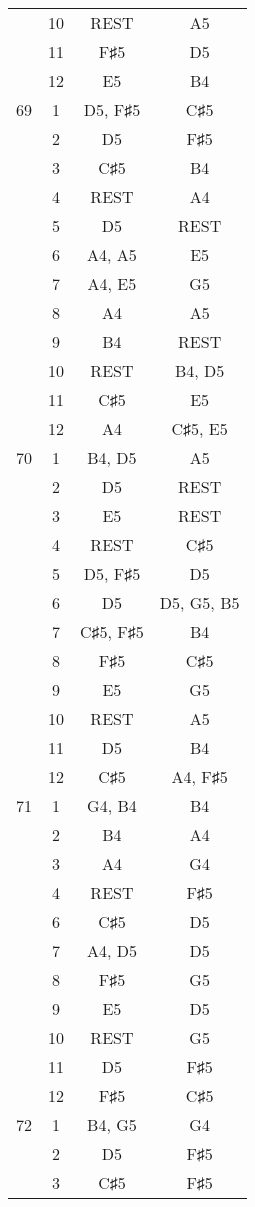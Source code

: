 \documentclass{article}
\begin{document}
\begin{longtable}{|c|c|c|c|}
  & 10 & REST & A5 \\ 
  & 11 & F♯5 & D5 \\ 
  & 12 & E5 & B4 \\ 
\hline
69 & 1 & D5, F♯5 & C♯5 \\ 
  & 2 & D5 & F♯5 \\ 
  & 3 & C♯5 & B4 \\ 
  & 4 & REST & A4 \\ 
  & 5 & D5 & REST \\ 
  & 6 & A4, A5 & E5 \\ 
  & 7 & A4, E5 & G5 \\ 
  & 8 & A4 & A5 \\ 
  & 9 & B4 & REST \\ 
  & 10 & REST & B4, D5 \\ 
  & 11 & C♯5 & E5 \\ 
  & 12 & A4 & C♯5, E5 \\ 
\hline
70 & 1 & B4, D5 & A5 \\ 
  & 2 & D5 & REST \\ 
  & 3 & E5 & REST \\ 
  & 4 & REST & C♯5 \\ 
  & 5 & D5, F♯5 & D5 \\ 
  & 6 & D5 & D5, G5, B5 \\ 
  & 7 & C♯5, F♯5 & B4 \\ 
  & 8 & F♯5 & C♯5 \\ 
  & 9 & E5 & G5 \\ 
  & 10 & REST & A5 \\ 
  & 11 & D5 & B4 \\ 
  & 12 & C♯5 & A4, F♯5 \\ 
\hline
71 & 1 & G4, B4 & B4 \\ 
  & 2 & B4 & A4 \\ 
  & 3 & A4 & G4 \\ 
  & 4 & REST & F♯5 \\ 
  & 6 & C♯5 & D5 \\ 
  & 7 & A4, D5 & D5 \\ 
  & 8 & F♯5 & G5 \\ 
  & 9 & E5 & D5 \\ 
  & 10 & REST & G5 \\ 
  & 11 & D5 & F♯5 \\ 
  & 12 & F♯5 & C♯5 \\ 
\hline
72 & 1 & B4, G5 & G4 \\ 
  & 2 & D5 & F♯5 \\ 
  & 3 & C♯5 & F♯5 \\ 

\end{longtable}
\end{document}
